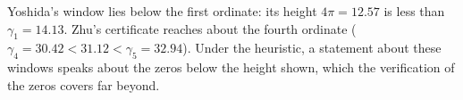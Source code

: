 \begin{table}[t]
\centering
{}
\caption{The horizon $2\pi e^{2a}$ at the half lengths of some window statements, and the half length $\frac12\log(H/2\pi)=13.45$ at which it equals the height $H=3\times10^{12}$ of the verification of the zeros. The conversion is a heuristic and not a theorem.}
\label{zh:tab:heights}
\end{table}

Yoshida's window lies below the first ordinate: its height $4\pi=12.57$ is less than $\gamma_1=14.13$. Zhu's certificate reaches about the fourth ordinate ($\gamma_4=30.42<31.12<\gamma_5=32.94$). Under the heuristic, a statement about these windows speaks about the zeros below the height shown, which the verification of the zeros covers far beyond.
